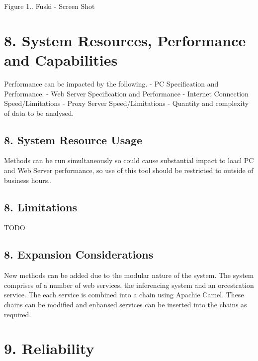  \begin{center} Figure 1.. Fuski -\/ Screen Shot \end{center} \hypertarget{index_sec_8}{}\section{8.	\+System Resources, Performance and Capabilities}\label{index_sec_8}
\begin{DoxyVerb}Performance can be impacted by the following.
 - PC Specification and Performance.
 - Web Server Specification and Performance
 - Internet Connection Speed/Limitations
 - Proxy Server Speed/Limitations
 - Quantity and complexity of data to be analysed.
\end{DoxyVerb}
\hypertarget{index_sec_8_1}{}\subsection{8.	\+System Resource Usage}\label{index_sec_8_1}
\begin{DoxyVerb}Methods can be run simultaneously so could cause substantial impact to loacl PC and 
Web Server performance, so use of this tool should be restricted to outside of business 
hours..
\end{DoxyVerb}
\hypertarget{index_sec_8_2}{}\subsection{8.	\+Limitations}\label{index_sec_8_2}
\begin{DoxyVerb}TODO
\end{DoxyVerb}
\hypertarget{index_sec_8_3}{}\subsection{8.	\+Expansion Considerations}\label{index_sec_8_3}
\begin{DoxyVerb}New methods can be added due to the modular nature of the system.  The system comprises
 of a number of web services, the inferencing system and an orcestration service.  The 
 each service is combined into a chain using Apachie Camel.  These chains can be modified 
 and enhansed services can be inserted into the chains as required.  
\end{DoxyVerb}
\hypertarget{index_sec_9}{}\section{9.	\+Reliability}\label{index_sec_9}
